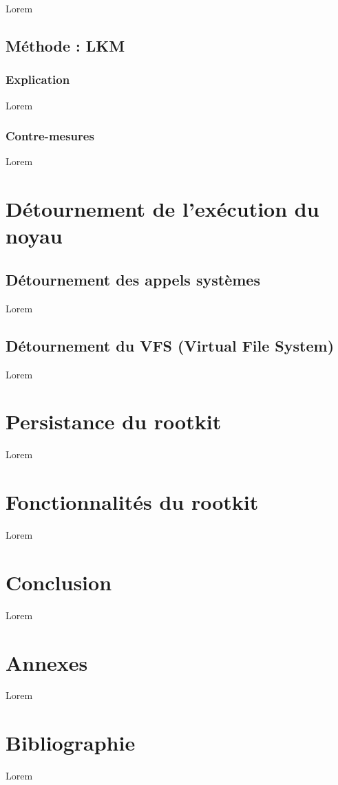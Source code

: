 \documentclass[11pt]{article}
\begin{document}
			Lorem

	\subsection{Méthode : LKM}
		\subsubsection{Explication}
			Lorem
		\subsubsection{Contre-mesures}
			Lorem
	
\section{Détournement de l'exécution du noyau}	

	\subsection{Détournement des appels systèmes}
	Lorem
	\subsection{ Détournement du VFS (Virtual File System)}
	Lorem
\section{Persistance du rootkit}
	Lorem
\section{Fonctionnalités du rootkit}
	Lorem
\section{Conclusion}
	Lorem
\section{Annexes}
	Lorem
\section{Bibliographie}
	Lorem
\end{document}
